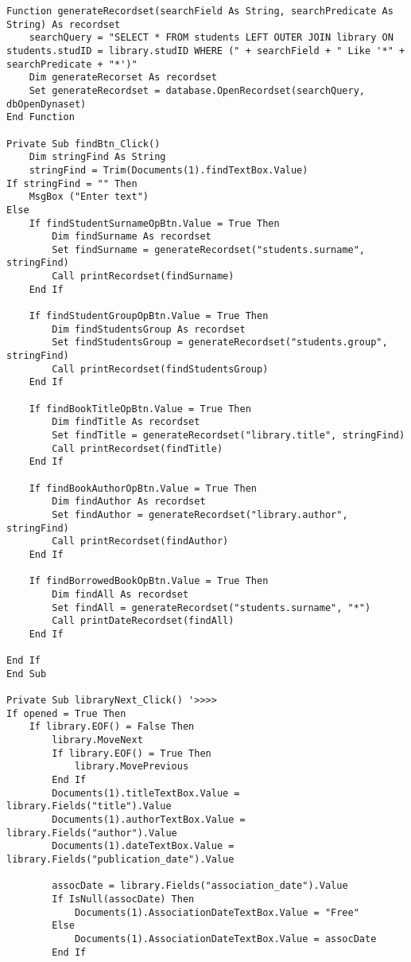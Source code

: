 \begin{lstlisting}[caption=VBA code]
Function generateRecordset(searchField As String, searchPredicate As String) As recordset
    searchQuery = "SELECT * FROM students LEFT OUTER JOIN library ON students.studID = library.studID WHERE (" + searchField + " Like '*" + searchPredicate + "*')"
    Dim generateRecorset As recordset
    Set generateRecordset = database.OpenRecordset(searchQuery, dbOpenDynaset)
End Function

Private Sub findBtn_Click()
    Dim stringFind As String
    stringFind = Trim(Documents(1).findTextBox.Value)
If stringFind = "" Then
    MsgBox ("Enter text")
Else
    If findStudentSurnameOpBtn.Value = True Then
        Dim findSurname As recordset
        Set findSurname = generateRecordset("students.surname", stringFind)
        Call printRecordset(findSurname)
    End If

    If findStudentGroupOpBtn.Value = True Then
        Dim findStudentsGroup As recordset
        Set findStudentsGroup = generateRecordset("students.group", stringFind)
        Call printRecordset(findStudentsGroup)
    End If
    
    If findBookTitleOpBtn.Value = True Then
        Dim findTitle As recordset
        Set findTitle = generateRecordset("library.title", stringFind)
        Call printRecordset(findTitle)
    End If
    
    If findBookAuthorOpBtn.Value = True Then
        Dim findAuthor As recordset
        Set findAuthor = generateRecordset("library.author", stringFind)
        Call printRecordset(findAuthor)
    End If
    
    If findBorrowedBookOpBtn.Value = True Then
        Dim findAll As recordset
        Set findAll = generateRecordset("students.surname", "*")
        Call printDateRecordset(findAll)
    End If
    
End If
End Sub

Private Sub libraryNext_Click() '>>>>
If opened = True Then
    If library.EOF() = False Then
        library.MoveNext
        If library.EOF() = True Then
            library.MovePrevious
        End If
        Documents(1).titleTextBox.Value = library.Fields("title").Value
        Documents(1).authorTextBox.Value = library.Fields("author").Value
        Documents(1).dateTextBox.Value = library.Fields("publication_date").Value
        
        assocDate = library.Fields("association_date").Value
        If IsNull(assocDate) Then
            Documents(1).AssociationDateTextBox.Value = "Free"
        Else
            Documents(1).AssociationDateTextBox.Value = assocDate
        End If
        

\end{lstlisting}
